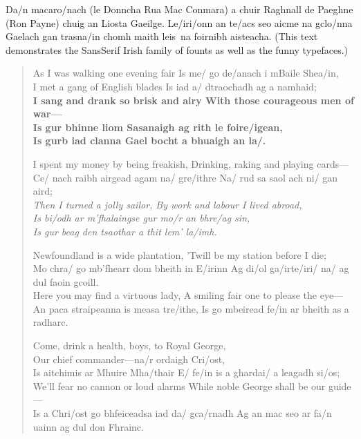 \documentclass{article}
\begin{document}
\newcommand\english{\sffamily}
\newcommand\irish{\selectfont}
\irish Da/n macaro/nach (le Donncha Rua Mac Conmara)
a chuir Raghnall de Paeghne {\english (Ron Payne)}
chuig an Liosta Gaeilge.
Le/iri/onn an te/acs seo aicme na gclo/nna Gaelach gan trasna/in
chomh maith leis~na foirnibh aisteacha.
\english (This text demonstrates the SansSerif Irish family of founts
as well as the funny typefaces.)

\begin{verse}
{
\english As I was walking one evening fair \quad
\irish Is me/ go de/anach i mBaile Shea/in, \\
\english I met a gang of English blades \quad
\irish Is iad a/ dtraochadh ag a namhaid;} \\
\textbf{\english I sang and drank so brisk and airy \quad
With those courageous men of war--- \\
\irish Is gur bhinne liom Sasanaigh ag rith le foire/igean, \\\hfill
Is gurb iad clanna Gael bocht a bhuaigh an la/.}

\english I spent my money by being freakish, \quad
Drinking, raking and playing cards--- \\
\irish Ce/ nach raibh airgead agam na/ gre/ithre \quad
Na/ rud sa saol ach ni/ gan aird; \\
\textsl{\english Then I turned a jolly sailor, \quad
By work and labour I lived abroad, \\
\irish Is bi/odh ar m'fhalaingse gur mo/r an bhre/ag sin, \\\hfill
Is gur beag den tsaothar a thit lem' la/imh.}

{\cmssq Newfoundland is a wide plantation, \quad
'Twill be my station before I die;} \\
{\eiadssq Mo chra/ go mb'fhearr dom bheith in E/irinn \quad
Ag di/ol ga/irte/iri/ na/ ag dul faoin gcoill.} \\
{\cmssqi Here you may find a virtuous lady, \quad
A smiling fair one to please the eye---} \\
{\eiadssqi An paca straipeanna is measa tre/ithe, \quad
Is go mbeiread fe/in ar bheith as a radharc.}

{\cmfi Come, drink a health, boys, to Royal George, \\\hfill
Our chief commander---}{\eiadfi na/r ordaigh Cri/ost, \\
Is aitchimis ar Mhuire Mha/thair \quad
E/ fe/in is a ghardai/ a leagadh si/os;} \\
{\cmff We'll fear no cannon or loud alarms \quad
While noble George shall be our guide---} \\
{\eiadff Is a Chri/ost go bhfeiceadsa iad da/ gca/rnadh \quad
Ag an mac seo ar fa/n uainn ag dul don Fhrainc.}
\end{verse}
\end{document}
